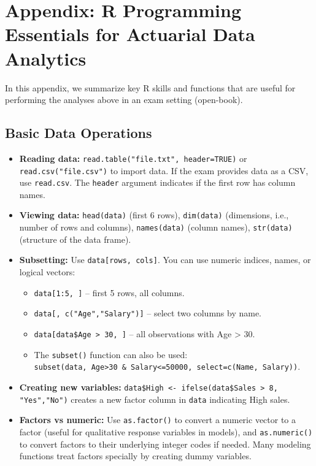 \documentclass[11pt]{article}
\begin{document}
\appendix
\section{Appendix: R Programming Essentials for Actuarial Data Analytics}
In this appendix, we summarize key R skills and functions that are useful for performing the analyses above in an exam setting (open-book).

\subsection{Basic Data Operations}
\begin{itemize}
    \item \textbf{Reading data:} \verb|read.table("file.txt", header=TRUE)| or \verb|read.csv("file.csv")| to import data. If the exam provides data as a CSV, use \texttt{read.csv}. The \texttt{header} argument indicates if the first row has column names.
    
    \item \textbf{Viewing data:} \verb|head(data)| (first 6 rows), \verb|dim(data)| (dimensions, i.e., number of rows and columns), \verb|names(data)| (column names), \verb|str(data)| (structure of the data frame).
    
    \item \textbf{Subsetting:} Use \verb|data[rows, cols]|. You can use numeric indices, names, or logical vectors:
    \begin{itemize}
        \item \verb|data[1:5, ]| – first 5 rows, all columns.
        \item \verb|data[, c("Age","Salary")]| – select two columns by name.
        \item \verb|data[data$Age > 30, ]| – all observations with Age > 30.
        \item The \texttt{subset()} function can also be used: \\
        \verb|subset(data, Age>30 & Salary<=50000, select=c(Name, Salary))|.
    \end{itemize}
    
    \item \textbf{Creating new variables:} \verb|data$High <- ifelse(data$Sales > 8, "Yes","No")| creates a new factor column in \texttt{data} indicating High sales.
    
    \item \textbf{Factors vs numeric:} Use \verb|as.factor()| to convert a numeric vector to a factor (useful for qualitative response variables in models), and \verb|as.numeric()| to convert factors to their underlying integer codes if needed. Many modeling functions treat factors specially by creating dummy variables.
\end{itemize}
\end{document}

